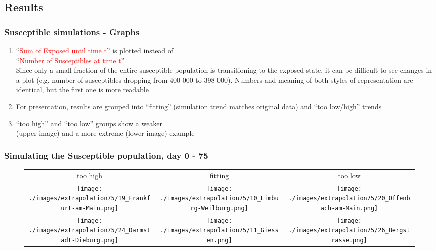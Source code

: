 \documentclass{beamer}
\begin{document}
\subsection{Results}
\begin{frame}
	\frametitle{Susceptible simulations - Graphs}
	\begin{enumerate}[$\bullet$]
		\item ``\textcolor{red}{Sum of Exposed \underline{until} time t}'' is plotted \underline{instead} of\\``\textcolor{red}{Number of Susceptibles \underline{at} time t}''\\
			Since only a small fraction of the entire susceptible population is transitioning to the exposed state, it can be difficult to see 
			changes in a plot (e.g. number of susceptibles dropping from 400 000 to 398 000). Numbers and meaning of both styles of representation are identical, but the
			first one is more readable
		\item For presentation, results are grouped into ``fitting'' (simulation trend matches original data) and ``too low/high'' trends
		\item ``too high'' and ``too low'' groups show a weaker\\(upper image) and a more extreme (lower image) example
	\end{enumerate}
\end{frame}

\begin{frame}
	\frametitle{Simulating the Susceptible population, day 0 - 75}
	\begin{center}
		\begin{figure}
			\begin{adjustwidth}{-0.8cm}{}
			\begin{tabular}{c|c|c}
				too high & fitting & too low \\
				\texttt{[image: ./images/extrapolation75/19\_Frankfurt-am-Main.png]}
					& \texttt{[image: ./images/extrapolation75/10\_Limburg-Weilburg.png]}
					& \texttt{[image: ./images/extrapolation75/20\_Offenbach-am-Main.png]} \\
				\texttt{[image: ./images/extrapolation75/24\_Darmstadt-Dieburg.png]}
					& \texttt{[image: ./images/extrapolation75/11\_Giessen.png]}
					& \texttt{[image: ./images/extrapolation75/26\_Bergstrasse.png]}
			\end{tabular}
			\end{adjustwidth}
		\end{figure}
	\end{center}
\end{frame}
\end{document}
